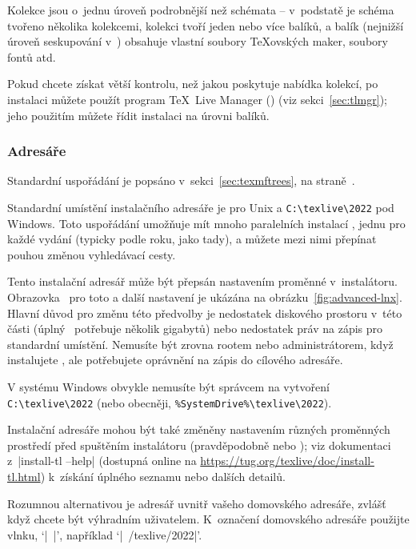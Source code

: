 \documentclass[\classoptions,slovak,english,czech]{\classname}
\def\p.{na straně~}
\begin{document}
Kolekce jsou o~jednu úroveň podrobnější než schémata -- v~podstatě
je schéma tvořeno několika kolekcemi, kolekci tvoří jeden nebo více
balíků, a balík (nejnižší úroveň seskupování v~\TL) obsahuje vlastní
soubory \TeX ovských maker, soubory fontů atd. 

Pokud chcete získat větší kontrolu, než jakou poskytuje nabídka kolekcí, 
po instalaci můžete použít program \TeX\ Live Manager () 
(viz sekci~\ref{sec:tlmgr}); jeho použitím můžete řídit 
instalaci na úrovni balíků.

\subsubsection{Adresáře}
\label{sec:directories}

Standardní uspořádání je popsáno v~sekci~\ref{sec:texmftrees},
\p.\pageref{sec:texmftrees}. 

Standardní umístění instalačního adresáře je
 pro Unix
a \verb|C:\texlive\2022| pod Windows.
Toto uspořádání umožňuje mít mnoho paralelních instalací \TL, jednu pro každé vydání
(typicky podle roku, jako tady),
a můžete mezi nimi přepínat pouhou změnou vyhledávací cesty.

Tento instalační adresář může být přepsán nastavením proměnné  v~instalátoru.
Obrazovka \GUI\ pro toto a další nastavení je ukázána na obrázku~\ref{fig:advanced-lnx}.
Hlavní důvod pro změnu této předvolby je nedostatek diskového prostoru v~této části
(úplný \TL\ potřebuje několik gigabytů) nebo nedostatek práv
na zápis pro standardní umístění.
Nemusíte být zrovna rootem nebo administrátorem, když 
instalujete \TL, ale potřebujete oprávnění na zápis do cílového adresáře.

V systému Windows obvykle nemusíte být správcem
na vytvoření \verb|C:\texlive\2022| (nebo obecněji,
\verb|%SystemDrive%\texlive\2022|). 

Instalační adresáře mohou být také změněny nastavením různých proměnných 
prostředí před spuštěním instalátoru (pravděpodobně
 nebo
); viz dokumentaci z~|install-tl --help| 
(dostupná online na
\url{https://tug.org/texlive/doc/install-tl.html}) k~získání úplného seznamu 
nebo dalších detailů.

Rozumnou alternativou je adresář uvnitř vašeho domovského
adresáře, zvlášť když chcete být výhradním uživatelem. 
K~označení domovského adresáře použijte vlnku, `|~|',
například `|~/texlive/2022|'.
\end{document}
